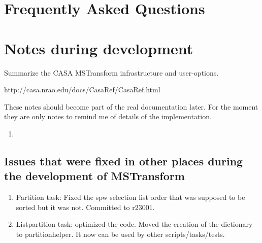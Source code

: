 \section{Frequently Asked Questions}\label{Sec:FAQ}


\section{Notes during development}

Summarize the CASA MSTransform infrastructure and user-options.

 {http://casa.nrao.edu/docs/CasaRef/CasaRef.html}

These notes should become part of the real documentation later. For the moment they are
only notes to remind me of details of the implementation.

\begin{enumerate}
       
\item 
\end{enumerate}

\subsection{Issues that were fixed in other places during the development of MSTransform}
\begin{enumerate}
\item Partition task: Fixed the spw selection list order that was supposed to be sorted but it was not.
Committed to r23001.
\item Listpartition task: optimized the code. Moved the creation of the dictionary to partitionhelper. It
now can be used by other scripts/tasks/tests.
\end{enumerate}

